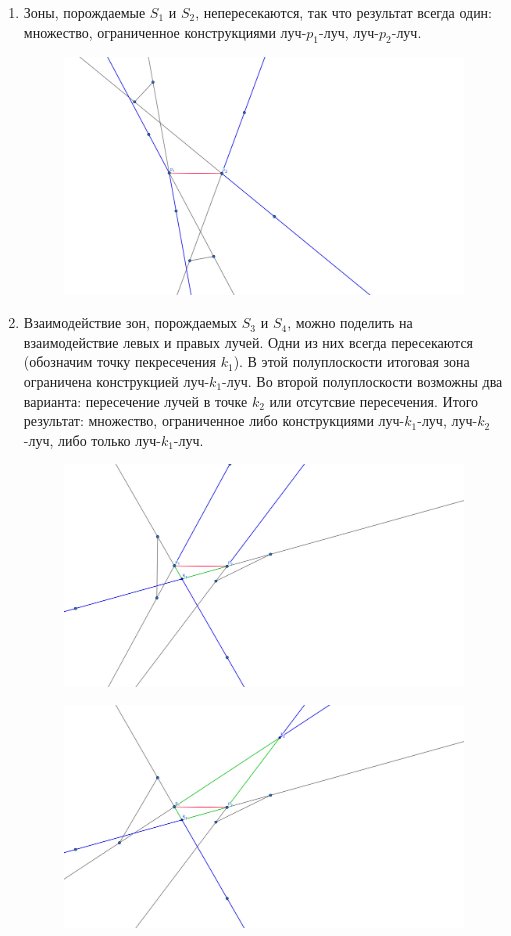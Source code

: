 \documentclass[letterpaper,12pt]{article}
\begin{document}
\begin{enumerate}
      \item Зоны, порождаемые $S_1$ и $S_2$, непересекаются, 
            так что результат всегда один: множество, 
            ограниченное конструкциями луч-$p_1$-луч, 
            луч-$p_2$-луч.
            \begin{figure}[H]
                  \centering
                  \includegraphics[width=0.5\linewidth]{nozone_2_1.png}
            \end{figure}
      \item Взаимодействие зон, порождаемых $S_3$ и $S_4$, 
            можно поделить на взаимодействие левых и правых
            лучей. Одни из них всегда пересекаются (обозначим
            точку пекресечения $k_1$). В этой полуплоскости
            итоговая зона ограничена конструкцией
            луч-$k_1$-луч. Во второй полуплоскости возможны два
            варианта: пересечение лучей в точке $k_2$ или
            отсутсвие пересечения. Итого результат: множество, 
            ограниченное либо конструкциями луч-$k_1$-луч, 
            луч-$k_2$-луч, либо только луч-$k_1$-луч.
            \begin{figure}[H]
                  \centering
                  \includegraphics[width=0.5\linewidth]{nozone_2_2.png}
            \end{figure}
            \begin{figure}[H]
                  \centering
                  \includegraphics[width=0.5\linewidth]{nozone_2_3.png}

\end{figure}
\end{enumerate}
\end{document}
